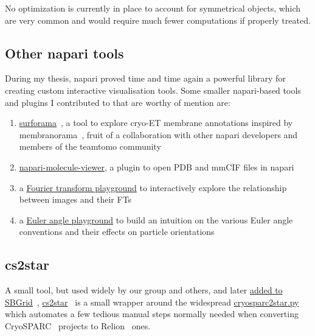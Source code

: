 No optimization is currently in place to account for symmetrical objects, which are very common and would require much fewer computations if properly treated.

\subsection{Other napari tools}

During my thesis, napari proved time and time again a powerful library for creating custom interactive visualisation tools.
Some smaller napari-based tools and plugins I contributed to that are worthy of mention are:

\begin{enumerate}
    \item \href{https://github.com/cellcanvas/surforama}{surforama}~\cite{yamauchiSurforamaInteractiveExploration2024}, a tool to explore cryo-ET membrane annotations inspired by membranorama~\cite{tegunovDtegunovMembranorama2024}, fruit of a collaboration with other napari developers and members of the teamtomo community
    \item \href{https://github.com/brisvag/napari-molecule-reader}{napari-molecule-viewer}, a plugin to open PDB and mmCIF files in napari
    \item a \href{https://github.com/napari/napari/blob/main/examples/fourier_transform_playground.py}{Fourier transform playground} to interactively explore the relationship between images and their FTs
    \item a \href{https://gist.github.com/brisvag/d6394d05b2f994e083ec279d6976484f}{Euler angle playground} to build an intuition on the various Euler angle conventions and their effects on particle orientations
\end{enumerate}

\subsection{cs2star}

A small tool, but used widely by our group and others, and later \href{https://sbgrid.org/software/titles/cs2star}{added to SBGrid}~\cite{morinCuttingEdgeCollaboration2013}, \href{https://github.com/brisvag/cs2star}{cs2star}~\cite{gaifasCs2starPy2021} is a small wrapper around the widespread \href{https://github.com/asarnow/pyem}{cryosparc2star.py} which automates a few tedious manual steps normally needed when converting CryoSPARC~\cite{punjaniCryoSPARCAlgorithmsRapid2017} projects to Relion~\cite{scheresRELIONImplementationBayesian2012} ones.

